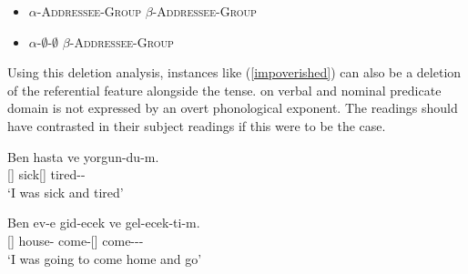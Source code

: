 \begin{itemize}
    \item $\alpha$-\textsc{Addressee}-\textsc{Group} {\And} $\beta$-{\textsc{Addressee}-\textsc{Group}}
    \item $\alpha$-$\emptyset$-$\emptyset$ {\And} $\beta$-{\textsc{Addressee}-\textsc{Group}}
\end{itemize}

Using this deletion analysis, instances like (\ref{impoverished}) can also be a deletion of the referential feature alongside the tense. {\Tsg} on verbal and nominal predicate domain is not expressed by an overt phonological exponent. The readings should have contrasted in their subject readings if this were to be the case. 

\begin{exe}
    \ex \label{impoverished}
    \begin{xlist}
        \ex \gll Ben hasta ve yorgun-du-m. \\
        {\Fsg}[{\Nom}] sick[{\Tsg}] {\And} tired-{\Pst}-{\Fsg} \\
        \glt `I was sick and tired'
        
        \ex \gll Ben ev-e gid-ecek ve gel-ecek-ti-m. \\
        {\Fsg}[{\Nom}] house-{\Dat} come-{\Fut}[{\Tsg}] {\And} come-{\Fut}-{\Pst}-{\Fsg} \\
        \glt `I was going to come home and go'
    \end{xlist}
\end{exe}

